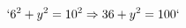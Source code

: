 \documentclass[preview]{standalone}
\begin{document}
\begin{align*}
`6^2 + y^2 = 10^2 \Rightarrow 36 + y^2 = 100`
\end{align*}
\end{document}
